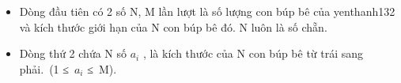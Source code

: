 \begin{itemize}
	\item     Dòng đầu tiên có 2 số N, M lần lượt là số lượng con búp bê của    yenthanh132    và kích thước giới hạn của N con búp bê đó. N luôn là số chẵn.   
	\item     Dòng thứ 2 chứa N số $a_{i}$    , là kích thước của N con búp bê từ trái sang phải. (1 ≤ $a_{i}$    ≤ M).   
\end{itemize}
